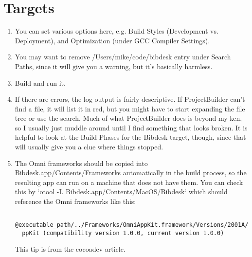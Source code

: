 \documentclass[11pt]{article}
\begin{document}
\section{Targets}
\begin{enumerate}
\item You can set various options here, e.g. Build Styles (Development vs. Deployment), and Optimization (under GCC Compiler Settings).
\item You may want to remove /Users/mike/code/bibdesk entry under Search Paths, since it will give you a warning, but it's basically harmless.
\item Build and run it.
\item If there are errors, the log output is fairly descriptive.  If ProjectBuilder can't find a file, it will list it in red, but you might have to start expanding the file tree or use the search.  Much of what ProjectBuilder does is beyond my ken, so I usually just muddle around until I find something that looks broken.  It is helpful to look at the Build Phases for the Bibdesk target, though, since that will usually give you a clue where things stopped.
\item The Omni frameworks should be copied into Bibdesk.app/Contents/Frameworks automatically in the build process, so the resulting app can run on a machine that does not have them.  You can check this by `otool -L Bibdesk.app/Contents/MacOS/Bibdesk` which should reference the Omni frameworks like this:  \begin{verbatim}
  @executable_path/../Frameworks/OmniAppKit.framework/Versions/2001A/OmniA
  ppKit (compatibility version 1.0.0, current version 1.0.0)\end{verbatim}  This tip is from the cocoadev article.
\end{enumerate}


 
\end{document}
